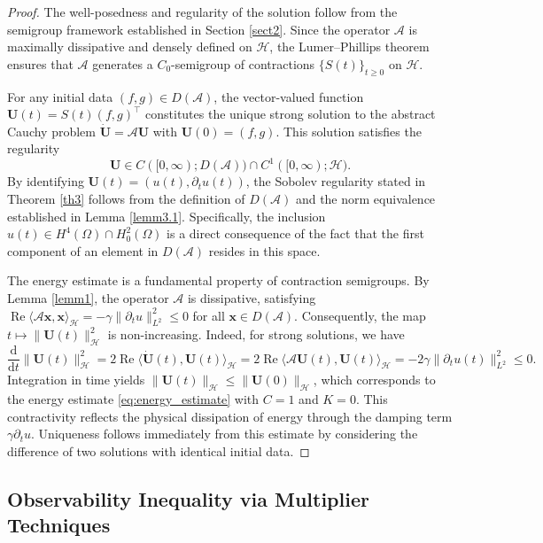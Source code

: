 \documentclass[12pt,reqno]{amsart}
\numberwithin{equation}{section}
\begin{document}
	\begin{proof}
		The well-posedness and regularity of the solution follow from the semigroup framework established in Section \ref{sect2}. Since the operator $\mathcal{A}$ is maximally dissipative and densely defined on $\mathcal{H}$, the Lumer--Phillips theorem ensures that $\mathcal{A}$ generates a $C_0$-semigroup of contractions $\{S(t)\}_{t \ge 0}$ on $\mathcal{H}$. 
		
		For any initial data $(f, g) \in D(\mathcal{A})$, the vector-valued function $\mathbf{U}(t) = S(t)(f, g)^\top$ constitutes the unique strong solution to the abstract Cauchy problem $\dot{\mathbf{U}} = \mathcal{A}\mathbf{U}$ with $\mathbf{U}(0) = (f, g)$. This solution satisfies the regularity 
		\[
		\mathbf{U} \in C([0, \infty); D(\mathcal{A})) \cap C^1([0, \infty); \mathcal{H}).
		\]
		By identifying $\mathbf{U}(t) = (u(t), \partial_t u(t))$, the Sobolev regularity stated in Theorem \ref{th3} follows from the definition of $D(\mathcal{A})$ and the norm equivalence established in Lemma \ref{lemm3.1}. Specifically, the inclusion $u(t) \in H^4(\Omega) \cap H_0^2(\Omega)$ is a direct consequence of the fact that the first component of an element in $D(\mathcal{A})$ resides in this space.
		
		The energy estimate is a fundamental property of contraction semigroups. By Lemma \ref{lemm1}, the operator $\mathcal{A}$ is dissipative, satisfying $\operatorname{Re} \langle \mathcal{A}\mathbf{x}, \mathbf{x} \rangle_{\mathcal{H}} = -\gamma \|\partial_t u\|_{L^2}^2 \le 0$ for all $\mathbf{x} \in D(\mathcal{A})$. Consequently, the map $t \mapsto \|\mathbf{U}(t)\|_{\mathcal{H}}^2$ is non-increasing. Indeed, for strong solutions, we have
		\[
		\frac{\mathrm{d}}{\mathrm{d}t} \|\mathbf{U}(t)\|_{\mathcal{H}}^2 = 2 \operatorname{Re} \langle \dot{\mathbf{U}}(t), \mathbf{U}(t) \rangle_{\mathcal{H}} = 2 \operatorname{Re} \langle \mathcal{A}\mathbf{U}(t), \mathbf{U}(t) \rangle_{\mathcal{H}} = -2\gamma \|\partial_t u(t)\|_{L^2}^2 \le 0.
		\]
		Integration in time yields $\|\mathbf{U}(t)\|_{\mathcal{H}} \le \|\mathbf{U}(0)\|_{\mathcal{H}}$, which corresponds to the energy estimate \eqref{eq:energy_estimate} with $C=1$ and $K=0$. This contractivity reflects the physical dissipation of energy through the damping term $\gamma \partial_t u$. Uniqueness follows immediately from this estimate by considering the difference of two solutions with identical initial data.
	\end{proof}
	
	
	\subsection{Observability Inequality via Multiplier Techniques}
	
\end{document}
